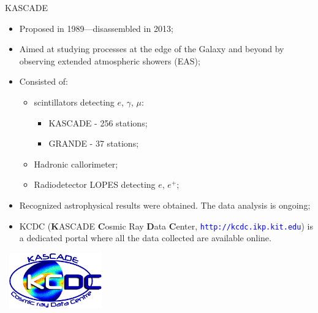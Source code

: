 \begin{frame}{KASCADE}
\begin{itemize}
  \item Proposed in 1989---disassembled in 2013;
  \item Aimed at studying processes at the edge of the Galaxy and beyond by observing extended atmospheric showers (EAS);
  \item Consisted of:
  \begin{itemize}
    \item scintillators detecting $e$, $\gamma$, $\mu$:
    \begin{itemize}
    \item KASCADE - 256 stations;
    \item GRANDE - 37 stations;
    \end{itemize}
    \item Hadronic callorimeter;
    \item Radiodetector LOPES detecting $e$, $e^{+}$;
  \end{itemize}
  \item Recognized astrophysical results were obtained. The data analysis is ongoing;
  \item KCDC (\textbf{K}ASCADE \textbf{C}osmic Ray \textbf{D}ata \textbf{C}enter, \textcolor{blue}{\texttt{http://kcdc.ikp.kit.edu}}) is a dedicated portal where all the data collected are available online. %
\end{itemize}

\parbox[t][0pt]{0pt}{
  \vspace{-0.63\textheight}
  ~\hspace{0.68\textwidth}\includegraphics[width=0.3\textwidth]{pics/KCDC-logo.png}
}
\end{frame}

